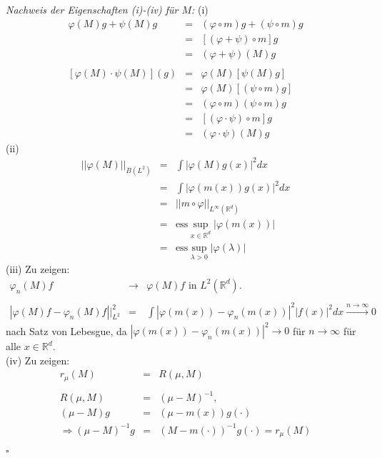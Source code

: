 \documentclass[12pt,a4paper,titlepage]{scrartcl}
\numberwithin{equation}{section}
\newcommand{\R}{\mathbb{R}} %
\newcommand{\m}{\cdot}
\newcommand{\qed}{\begin{flushright}
		$\square$
	\end{flushright}}
\begin{document}
	\emph{Nachweis der Eigenschaften (i)-(iv) für $M$:} (i)
	\begin{eqnarray}
		\varphi(M)g +\psi(M)g &=& (\varphi\circ m)g+(\psi\circ m)g\nonumber\\
		&=& \left[(\varphi+\psi)\circ m \right]g \nonumber\\
		&=& (\varphi+\psi)(M)g\nonumber\\ \nonumber\\
		\left[\varphi(M)\m \psi(M) \right](g) &=& \varphi(M)\left[\psi(M)g \right]\nonumber\\
		&=& \varphi(M)\left[(\psi\circ m)g \right]\nonumber\\
		&=& (\varphi\circ m)(\psi\circ m)g\nonumber\\
		&=& \left[(\varphi\m \psi)\circ m\right] g\nonumber\\
		&=& (\varphi\m \psi)(M)g\nonumber
	\end{eqnarray}
	(ii)
	\begin{eqnarray}
		||\varphi(M)||_{B(L^2)} &=& \int |\varphi(M)g(x)|^2 dx\nonumber\\
		&=& \int|\varphi(m(x))g(x)|^2dx\nonumber\\
		&=& ||m\circ\varphi||_{L^\infty(\R^d)}\nonumber\\
		&=& \text{ess}\sup_{x\in \R^d}|\varphi(m(x))|\nonumber\\
		&=& \text{ess}\sup_{\lambda>0}|\varphi(\lambda)|\nonumber
	\end{eqnarray}
	(iii) Zu zeigen:
	\begin{eqnarray}
		\varphi_n(M)f &\rightarrow& \varphi(M)f\text{ in } L^2(\R^d).\nonumber\\
		\nonumber\\
		|\varphi(M)f-\varphi_n(M)f||_{L^2}^2 &=&\int |\varphi(m(x)) - \varphi_n(m(x))|^2 |f(x)|^2 dx\overset{n\rightarrow \infty}{\longrightarrow} 0\nonumber
	\end{eqnarray}
	nach Satz von Lebesgue, da $|\varphi(m(x)) - \varphi_n(m(x))|^2\rightarrow 0$ für $n\rightarrow\infty$ für alle $x\in \R^d$.\\
	(iv) Zu zeigen:
	\begin{eqnarray}
		r_\mu(M) &=& R(\mu, M)\nonumber\\
		\nonumber\\
		R(\mu,M)&=& (\mu-M)^{-1},\nonumber\\
		(\mu-M)g&=& (\mu-m(x))g(\m)\nonumber\\
		\Rightarrow (\mu-M)^{-1}g &=& (M-m(\m))^{-1}g(\m) = r_\mu(M)\nonumber
	\end{eqnarray}
	\qed
	
\end{document}
